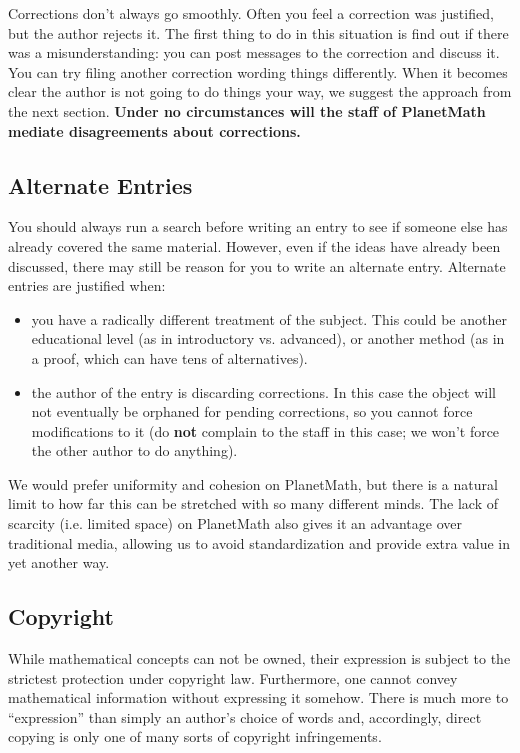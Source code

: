 Corrections don't always go smoothly. Often you feel a correction was
justified, but the author rejects it. The first thing to do in this
situation is find out if there was a misunderstanding: you can post
messages to the correction and discuss it. You can try filing another
correction wording things differently. When it becomes clear the
author is not going to do things your way, we suggest the approach
from the next section. \textbf{Under no circumstances will the staff
of PlanetMath mediate disagreements about corrections.}

\subsection*{Alternate Entries}
You should always run a search before writing an entry to see if
someone else has already covered the same material. However, even if
the ideas have already been discussed, there may still be reason for
you to write an alternate entry. Alternate entries are justified when:
\begin{itemize}
\item you have a radically different treatment of the subject. This
could be another educational level (as in introductory
vs. advanced), or another method (as in a proof, which can have tens
of alternatives).
\item the author of the entry is discarding corrections. In this case
the object will not eventually be orphaned for pending corrections,
so you cannot force modifications to it (do \textbf{not} complain to
the staff in this case; we won't force the other author to do
anything).
\end{itemize}
We would prefer uniformity and cohesion on PlanetMath, but there is a
natural limit to how far this can be stretched with so many different
minds. The lack of scarcity (i.e. limited space) on PlanetMath also
gives it an advantage over traditional media, allowing us to avoid
standardization and provide extra value in yet another way.

\subsection*{Copyright}
While mathematical concepts can not be owned, their expression is
subject to the strictest protection under copyright law. Furthermore,
one cannot convey mathematical information without expressing it
somehow. There is much more to ``expression'' than simply an
author's choice of words and, accordingly, direct copying is only one
of many sorts of copyright infringements.

